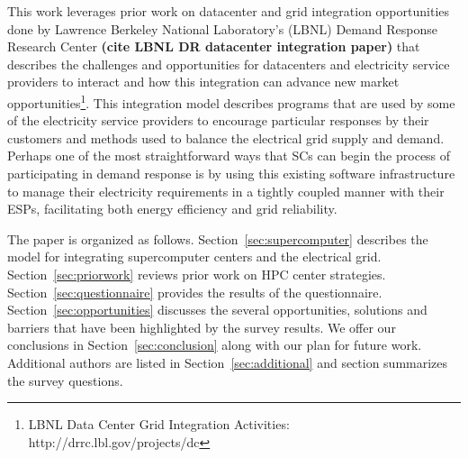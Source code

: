 This work leverages prior work on datacenter and grid integration opportunities
done by Lawrence Berkeley National Laboratory's (LBNL) Demand Response 
Research Center \textbf{(cite LBNL DR datacenter integration paper)}
that describes the challenges and opportunities for datacenters and electricity
service providers to interact and how this integration can advance 
new market 
opportunities\footnote{LBNL Data Center Grid Integration Activities: http://drrc.lbl.gov/projects/dc}.
This integration model describes programs that are used by some of the electricity 
service providers to encourage particular responses by their customers and methods 
used to balance the electrical grid supply and demand.
Perhaps one of the most straightforward ways that SCs can begin
the process of participating in demand response is by using this existing software 
infrastructure to manage their electricity requirements in a tightly coupled manner 
with their ESPs, facilitating both energy efficiency and grid reliability.

The paper is organized as follows.
Section~\ref{sec:supercomputer}  describes the model for
integrating supercomputer centers and the electrical grid. Section~\ref{sec:priorwork}
reviews prior work on HPC center strategies. Section~\ref{sec:questionnaire} 
provides the results of the questionnaire. 
Section~\ref{sec:opportunities} 
discusses the several opportunities, solutions and barriers that have been highlighted 
by the survey results. We offer our conclusions in Section~\ref{sec:conclusion} along 
with our plan for future work.  Additional authors are listed in Section~\ref{sec:additional} and
section  summarizes the survey questions.

